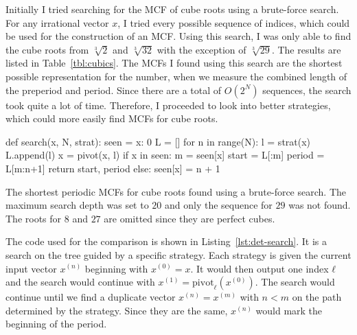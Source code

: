 Initially I tried searching for the MCF of cube roots
using a brute-force search.
For any irrational vector $x$,
I tried every possible sequence of indices,
which could be used for the construction of an MCF.
Using this search, I was only able to find the cube roots from $\sqrt[3]{2}$
and $\sqrt[3]{32}$ with the exception of $\sqrt[3]{29}$.
The results are listed in Table~\vref{tbl:cubics}.
The MCFs I found using this search are the shortest possible representation
for the number, when we measure the combined length of the preperiod and
period.
Since there are a total of $O(2^N)$ sequences,
the search took quite a lot of time.
Therefore, I proceeded to look into better strategies,
which could more easily find MCFs for cube roots.

\begin{Python}[
    float=tbp,
    numbers=left,
    caption={
      The implementation of the search for periodic MCFs.
      The strategy \texttt{strat} outputs a single index $ℓ$, which is used
      for pivoting.
      The search stops once a duplicate vector $x$ has been found and the
      program returns the preperiod and period once found.
    },
    label={lst:det-search},
  ]
def search(x, N, strat):
  seen = {x: 0}
  L = []
  for n in range(N):
    l = strat(x)
    L.append(l)
    x = pivot(x, l)
    if x in seen:
      m = seen[x]
      start = L[:m]
      period = L[m:n+1]
      return start, period
    else:
      seen[x] = n + 1
\end{Python}

\begin{table}[tbp]
  \caption{
    The shortest periodic MCFs for cube roots found using a
    brute-force search. The maximum search depth was set to $20$ and
    only the sequence for $29$ was not found. The roots for $8$ and $27$ are
    omitted since they are perfect cubes.}
  \label{tbl:cubics}
  \centering
  
\end{table}

The code used for the comparison is shown in Listing~\ref{lst:det-search}.
It is a search on the tree guided by a specific strategy.
Each strategy is given the current input vector $x^{(n)}$ beginning with $x^{(0)} = x$.
It would then output one index $ℓ$ and the search would continue with
$x^{(1)} = \mathrm{pivot}_ℓ(x^{(0)})$.
The search would continue until we find a duplicate vector $x^{(n)} = x^{(m)}$
with $n < m$ on the path determined by the strategy.
Since they are the same, $x^{(n)}$ would mark the beginning of the period.

